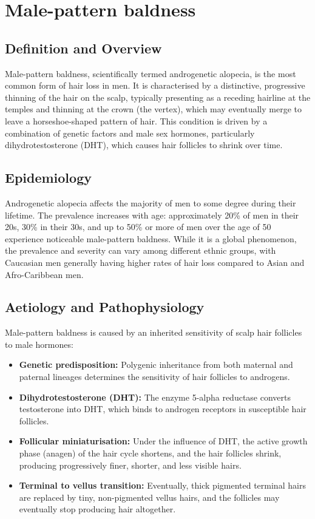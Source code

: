 \chapter{Male-pattern baldness}

\section*{Definition and Overview}
Male-pattern baldness, scientifically termed androgenetic alopecia, is the most common form of hair loss in men. It is characterised by a distinctive, progressive thinning of the hair on the scalp, typically presenting as a receding hairline at the temples and thinning at the crown (the vertex), which may eventually merge to leave a horseshoe-shaped pattern of hair. This condition is driven by a combination of genetic factors and male sex hormones, particularly dihydrotestosterone (DHT), which causes hair follicles to shrink over time.

\section*{Epidemiology}
Androgenetic alopecia affects the majority of men to some degree during their lifetime. The prevalence increases with age: approximately 20\% of men in their 20s, 30\% in their 30s, and up to 50\% or more of men over the age of 50 experience noticeable male-pattern baldness. While it is a global phenomenon, the prevalence and severity can vary among different ethnic groups, with Caucasian men generally having higher rates of hair loss compared to Asian and Afro-Caribbean men.

\section*{Aetiology and Pathophysiology}
Male-pattern baldness is caused by an inherited sensitivity of scalp hair follicles to male hormones:

\begin{itemize}
    \item \textbf{Genetic predisposition:} Polygenic inheritance from both maternal and paternal lineages determines the sensitivity of hair follicles to androgens.
    \item \textbf{Dihydrotestosterone (DHT):} The enzyme 5-alpha reductase converts testosterone into DHT, which binds to androgen receptors in susceptible hair follicles.
    \item \textbf{Follicular miniaturisation:} Under the influence of DHT, the active growth phase (anagen) of the hair cycle shortens, and the hair follicles shrink, producing progressively finer, shorter, and less visible hairs.
    \item \textbf{Terminal to vellus transition:} Eventually, thick pigmented terminal hairs are replaced by tiny, non-pigmented vellus hairs, and the follicles may eventually stop producing hair altogether.
\end{itemize}

